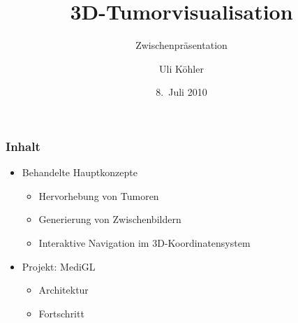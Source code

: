 \documentclass{beamer}
\title{3D-Tumorvisualisation}
\subtitle{Zwischenpräsentation}
\author{Uli Köhler}
\institute[EMG]{Ernst-Mach-Gymnasium Haar}
\date{8.~Juli 2010}
\begin{document}
\frame{\titlepage}
\begin{frame}
   \frametitle{Inhalt}
   \begin{itemize}
    \item  Behandelte Hauptkonzepte
    \begin{itemize}
      \item Hervorhebung von Tumoren
      \item Generierung von Zwischenbildern
      \item Interaktive Navigation im 3D-Koordinatensystem
    \end{itemize}
    \pause
    \item Projekt: MediGL
    \begin{itemize}
     \item Architektur
     \item Fortschritt
    \end{itemize}

   \end{itemize}

\end{frame}
\end{document}
